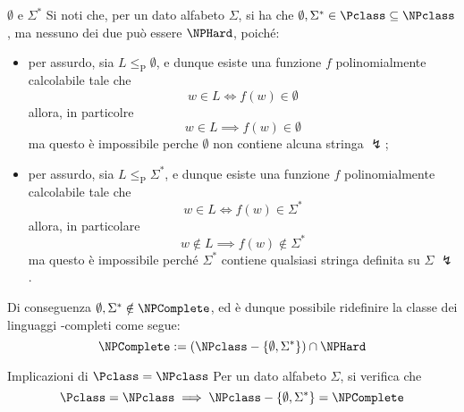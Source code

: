 \documentclass[a4paper, 12pt]{report}
\begin{document}
    \begin{framedobs}[label={emptyset e sigma star}, breakable]{$\emptyset$ e $\Sigma^*$}
        Si noti che, per un dato alfabeto $\Sigma$, si ha che $\emptyset, \Sigma^* \in \Pclass \subseteq \NPclass$, ma nessuno dei due può essere $\NPHard$, poiché:

        \begin{itemize}
            \item per assurdo, sia $L \leq_\mathrm P \emptyset$, e dunque esiste una funzione $f$ polinomialmente calcolabile tale che $$w \in L \iff f(w) \in \emptyset$$ allora, in particolre $$w \in L \implies f(w) \in \emptyset$$ ma questo è impossibile perche $\emptyset$ non contiene alcuna stringa $\lightning$;
            \item per assurdo, sia $L \leq_\mathrm P \Sigma^*$, e dunque esiste una funzione $f$ polinomialmente calcolabile tale che $$w \in L \iff f(w) \in \Sigma^*$$ allora, in particolare $$w \notin L \implies f(w) \notin \Sigma^*$$ ma questo è impossibile perché $\Sigma^*$ contiene qualsiasi stringa definita su $\Sigma$ $\lightning$.
        \end{itemize}

        Di conseguenza $\emptyset, \Sigma^* \notin \NPComplete$, ed è dunque possibile ridefinire la classe dei linguaggi \NPclass-completi come segue: $$\NPComplete := (\NPclass - \{\emptyset, \Sigma^*\}) \cap \NPHard$$
    \end{framedobs}

    \begin{framedprop}[label={p = np impl 5}]{Implicazioni di $\Pclass = \NPclass$}
        Per un dato alfabeto $\Sigma$, si verifica che $$\Pclass = \NPclass \implies \NPclass - \{\emptyset, \Sigma^*\} = \NPComplete$$
    \end{framedprop}
\end{document}
